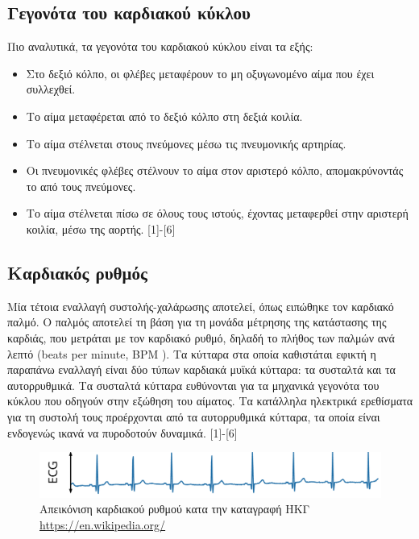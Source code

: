 \documentclass{report}
\newcommand \en {\selectlanguage{english}}
\newcommand \gr {\selectlanguage{greek}}
\begin{document}
\subsection{Γεγονότα  του καρδιακού κύκλου}
Πιο αναλυτικά, τα γεγονότα του καρδιακού κύκλου είναι τα εξής:
\begin{itemize}
    \item Στο δεξιό κόλπο, οι φλέβες μεταφέρουν το μη οξυγωνομένο αίμα που έχει συλλεχθεί. 
    \item Το αίμα μεταφέρεται από το δεξιό κόλπο στη δεξιά κοιλία.
    \item Το αίμα στέλνεται στους πνεύμονες μέσω τις πνευμονικής αρτηρίας.
    \item Οι πνευμονικές φλέβες στέλνουν το αίμα στον αριστερό κόλπο, απομακρύνοντάς το από τους πνεύμονες.
    \item Το αίμα στέλνεται πίσω σε όλους τους ιστούς, έχοντας μεταφερθεί στην αριστερή κοιλία, μέσω της αορτής. [1]-[6]
\end{itemize}
\subsection{Καρδιακός ρυθμός}
Μία τέτοια εναλλαγή συστολής-χαλάρωσης αποτελεί, όπως ειπώθηκε τον καρδιακό παλμό. Ο παλμός αποτελεί τη βάση για τη μονάδα μέτρησης της κατάστασης της καρδιάς, που μετράται με τον καρδιακό ρυθμό, δηλαδή το πλήθος των παλμών ανά λεπτό (\en beats per minute, BPM \gr). Τα κύτταρα στα οποία καθιστάται εφικτή η παραπάνω εναλλαγή είναι δύο τύπων καρδιακά μυϊκά κύτταρα: τα συσταλτά και τα αυτορρυθμικά. Τα συσταλτά κύτταρα ευθύνονται για τα μηχανικά γεγονότα του κύκλου που οδηγούν στην εξώθηση του αίματος. Τα κατάλληλα ηλεκτρικά ερεθίσματα για τη συστολή τους προέρχονται από τα αυτορρυθμικά κύτταρα, τα οποία είναι ενδογενώς ικανά να πυροδοτούν δυναμικά. [1]-[6]

\begin{figure}
    \centering
    \includegraphics[scale=0.3]{heart rhythm.png}    \caption{Απεικόνιση καρδιακού ρυθμού κατα την καταγραφή ΗΚΓ \en \protect\url{https://en.wikipedia.org/}}
\end{figure}
\end{document}
